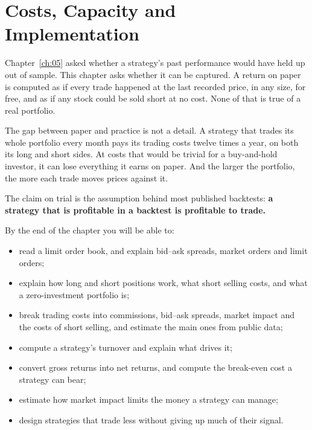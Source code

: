 \makeatletter
{}
\makeatother

\chapter{Costs, Capacity and Implementation}
\label{ch:06}

Chapter~\ref{ch:05} asked whether a strategy's past performance would have held up out of sample. This chapter asks whether it can be captured. A return on paper is computed as if every trade happened at the last recorded price, in any size, for free, and as if any stock could be sold short at no cost. None of that is true of a real portfolio.

The gap between paper and practice is not a detail. A strategy that trades its whole portfolio every month pays its trading costs twelve times a year, on both its long and short sides. At costs that would be trivial for a buy-and-hold investor, it can lose everything it earns on paper. And the larger the portfolio, the more each trade moves prices against it.

The claim on trial is the assumption behind most published backtests: \textbf{a strategy that is profitable in a backtest is profitable to trade.}

By the end of the chapter you will be able to:

\begin{itemize}
  \item read a limit order book, and explain bid--ask spreads, market orders and limit orders;
  \item explain how long and short positions work, what short selling costs, and what a zero-investment portfolio is;
  \item break trading costs into commissions, bid--ask spreads, market impact and the costs of short selling, and estimate the main ones from public data;
  \item compute a strategy's turnover and explain what drives it;
  \item convert gross returns into net returns, and compute the break-even cost a strategy can bear;
  \item estimate how market impact limits the money a strategy can manage;
  \item design strategies that trade less without giving up much of their signal.
\end{itemize}

